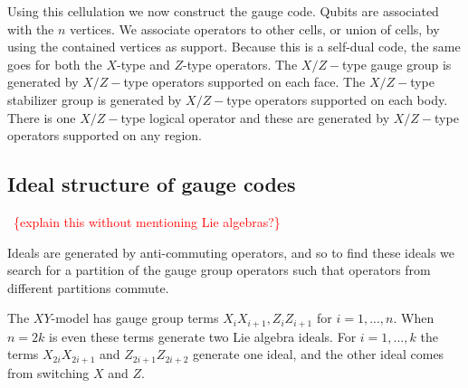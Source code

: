\documentclass[11pt,oneside]{article}
\newcommand{\todo}[1]{\ \textcolor{red}{\{#1\}}\ }
\begin{document}
Using this cellulation we now construct the gauge code.
Qubits are associated with the $n$ vertices.
We associate operators to other cells, or union of cells,
by using the contained vertices as support.
Because this is a self-dual code, the same goes for
both the $X$-type and $Z$-type operators.
The $X/Z-$type gauge group is generated by
$X/Z-$type operators supported on each face.
The $X/Z-$type stabilizer group is generated by
$X/Z-$type operators supported on each body.
There is one $X/Z-$type logical operator and these
are generated by
$X/Z-$type operators supported on any region.

\subsection{Ideal structure of gauge codes}

\todo{explain this without mentioning Lie algebras?}

Ideals are generated by anti-commuting operators,
and so to find these ideals we search for a partition of
the gauge group operators such that operators from
different partitions commute.

The $XY$-model has gauge group
terms $X_i X_{i+1}, Z_i Z_{i+1}$ for $i=1,...,n.$
When $n=2k$ is even 
these terms generate two Lie algebra ideals.
For $i=1,...,k$
the terms $X_{2i}X_{2i+1}$ and $Z_{2i+1}Z_{2i+2}$ 
generate one ideal, and the other ideal comes from switching $X$ and $Z.$
\end{document}
